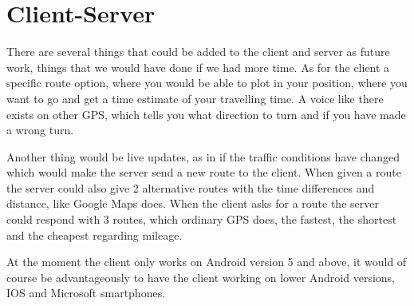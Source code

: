 \section{Client-Server}
There are several things that could be added to the client and server as future work, things that we would have done if we had more time. 
As for the client a specific route option, where you would be able to plot in your position, where you want to go and get a time estimate of your travelling time. A voice like there exists on other GPS, which tells you what direction to turn and if you have made a wrong turn.

Another thing would be live updates, as in if the traffic conditions have changed which would make the server send a new route to the client. When given a route the server could also give 2 alternative routes with the time differences and distance, like Google Maps does. 
When the client asks for a route the server could respond with 3 routes, which ordinary GPS does, the fastest, the shortest and the cheapest regarding  mileage.

At the moment the client only works on Android version 5 and above, it would of course be advantageously to have the client working on lower Android versions, IOS and Microsoft smartphones.